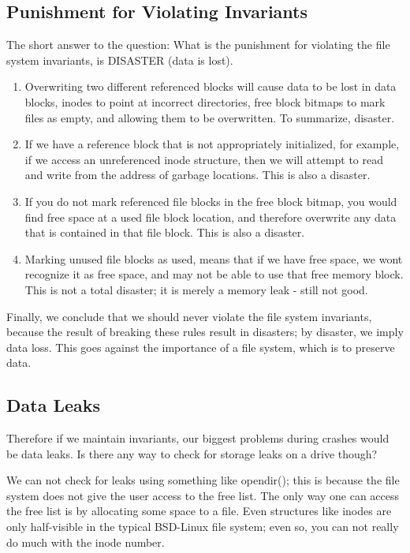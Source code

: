 \documentclass[a4paper]{article}
\begin{document}
\subsection{Punishment for Violating Invariants}
The short answer to the question: What is the punishment for violating the file system invariants, is DISASTER (data is lost).
\begin{enumerate}
\item Overwriting two different referenced blocks will cause data to be lost in data blocks, inodes to point at incorrect directories, free block bitmaps to mark files as empty, and allowing them to be overwritten. To summarize, disaster.
\item If we have a reference block that is not appropriately initialized, for example, if we access an unreferenced inode structure, then we will attempt to read and write from the address of garbage locations. This is also a disaster. 
\item If you do not mark referenced file blocks in the free block bitmap, you would find free space at a used file block location, and therefore overwrite any data that is contained in that file block. This is also a disaster.
\item Marking unused file blocks as used, means that if we have free space, we wont recognize it as free space, and may not be able to use that free memory block. This is not a total disaster; it is merely a memory leak - still not good.
\end{enumerate}

Finally, we conclude that we should never violate the file system invariants, because the result of breaking these rules result in disasters; by disaster, we imply data loss. This goes against the importance of a file system, which is to preserve data. 

\subsection{Data Leaks}
Therefore if we maintain invariants, our biggest problems during crashes would be data leaks. Is there any way to check for storage leaks on a drive though?

We can not check for leaks using something like opendir(); this is because the file system does not give the user access to the free list. The only way one can access the free list is by allocating some space to a file. Even structures like inodes are only half-visible in the typical BSD-Linux file system; even so, you can not really do much with the inode number. 
\end{document}

